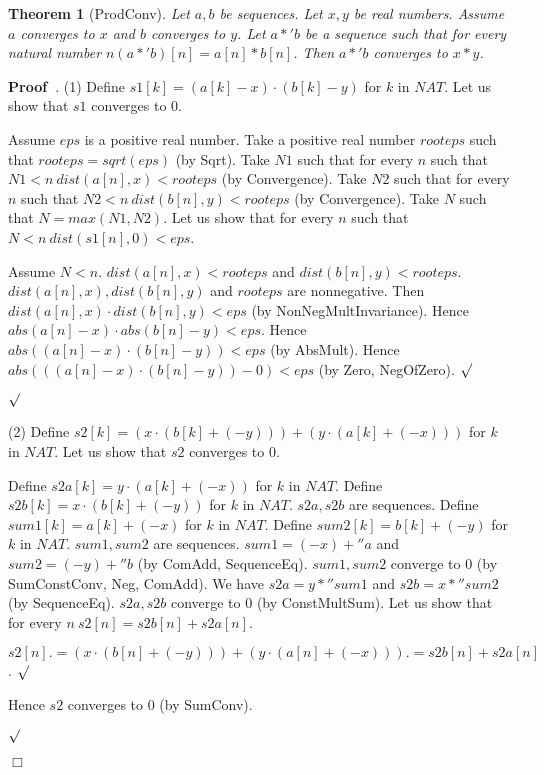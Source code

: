 \documentclass{article}
\newenvironment{forthel}{\begin{leftbar}}{\end{leftbar}}
\newenvironment{proof}{\noindent\textbf{Proof\ }}{\hspace*{\fill}$\Box$\medskip}
\newenvironment{subproof}{\begin{list}{}{}
		\item[\text{Proof}]}{\hfill $\surd$ \end{list}}
\newtheorem{theorem}{Theorem}
\begin{document}
\begin{forthel}
	\begin{theorem}[ProdConv]
	Let $a,b$ be sequences. Let $x,y$ be real numbers. Assume $a$ converges to $x$ and $b$ converges to $y$.
	Let $a *' b$ be a sequence such that for every natural number $n (a *' b)[n] = a[n] * b[n]$.
	Then $a *' b$ converges to $x * y$.
	\end{theorem}
	\begin{proof}.
	(1) Define $s1[k] = (a[k] - x) \cdot (b[k] - y)$ for $k$ in $NAT$.
	Let us show that $s1$ converges to $0$.
	\begin{subproof}
    Assume $eps$ is a positive real number. 
    Take a positive real number $rooteps$ such that $rooteps = sqrt(eps)$ (by Sqrt).
    Take $N1$ such that for every $n$ such that $N1 < n \ dist(a[n],x) < rooteps$ (by Convergence).
    Take $N2$ such that for every $n$ such that $N2 < n \ dist(b[n],y) < rooteps$ (by Convergence).
    Take $N$ such that $N = max(N1,N2)$.
    Let us show that for every $n$ such that $N < n \ dist(s1[n],0) < eps$.
    \begin{subproof}
    Assume $N < n$.
    $dist(a[n],x) < rooteps$ and $dist(b[n],y) < rooteps$.
    $dist(a[n],x), dist(b[n],y)$ and $rooteps$ are nonnegative.
    Then $dist(a[n],x) \cdot dist(b[n],y) < eps$ (by NonNegMultInvariance).
    Hence $abs(a[n] - x) \cdot abs(b[n] - y) < eps$.
    Hence $abs((a[n] - x) \cdot (b[n] - y)) < eps$ (by AbsMult).
    Hence $abs(((a[n] - x) \cdot (b[n] - y)) - 0) < eps$ (by Zero, NegOfZero).
    \end{subproof}
	\end{subproof}
	(2) Define $s2[k] = (x \cdot (b[k] + (-y))) + (y \cdot (a[k] + (-x)))$ for $k$ in $NAT$.
	Let us show that $s2$ converges to $0$.
	\begin{subproof}
	Define $s2a[k] = y \cdot (a[k] + (-x))$ for $k$ in $NAT$.
	Define $s2b[k] = x \cdot (b[k] + (-y))$ for $k$ in $NAT$.
	$s2a, s2b$ are sequences.
	Define $sum1[k] = a[k] + (-x)$ for $k$ in $NAT$.
	Define $sum2[k] = b[k] + (-y)$ for $k$ in $NAT$.
	$sum1, sum2$ are sequences.
	$sum1 = (-x) +'' a$ and $sum2 = (-y) +'' b$ (by ComAdd, SequenceEq).
	$sum1, sum2$ converge to $0$ (by SumConstConv, Neg, ComAdd).
	We have $s2a = y *'' sum1$ and $s2b = x *'' sum2$ (by SequenceEq).
	$s2a, s2b$ converge to $0$ (by ConstMultSum). 
	Let us show that for every $n \ s2[n] = s2b[n] + s2a[n]$.
	\begin{subproof}
	$s2[n] .= (x \cdot (b[n] + (-y))) + (y \cdot (a[n] + (-x)))
	.= s2b[n] + s2a[n]$.
	\end{subproof}
	Hence $s2$ converges to $0$ (by SumConv).

\end{subproof}
\end{proof}
\end{forthel}
\end{document}
